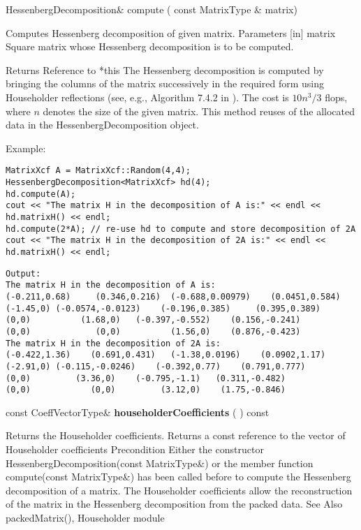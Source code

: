 HessenbergDecomposition\& compute  ( const MatrixType \&  matrix)   

Computes Hessenberg decomposition of given matrix. 
Parameters
[in] matrix Square matrix whose Hessenberg decomposition is to be computed.  

Returns Reference to *this 
The Hessenberg decomposition is computed by bringing the columns of the matrix successively in the required form using Householder reflections (see, e.g., Algorithm 7.4.2 in  \cite{Golub1996}). The cost is $10n^3/3$ flops, where $n$ denotes the size of the given matrix.
This method reuses of the allocated data in the HessenbergDecomposition object.


Example:
\begin{lstlisting}
MatrixXcf A = MatrixXcf::Random(4,4);
HessenbergDecomposition<MatrixXcf> hd(4);
hd.compute(A);
cout << "The matrix H in the decomposition of A is:" << endl << hd.matrixH() << endl;
hd.compute(2*A); // re-use hd to compute and store decomposition of 2A
cout << "The matrix H in the decomposition of 2A is:" << endl << hd.matrixH() << endl;
\end{lstlisting}

\begin{verbatim}
Output:
The matrix H in the decomposition of A is:
(-0.211,0.68)     (0.346,0.216)  (-0.688,0.00979)    (0.0451,0.584)
(-1.45,0) (-0.0574,-0.0123)    (-0.196,0.385)     (0.395,0.389)
(0,0)          (1.68,0)   (-0.397,-0.552)    (0.156,-0.241)
(0,0)             (0,0)          (1.56,0)    (0.876,-0.423)
The matrix H in the decomposition of 2A is:
(-0.422,1.36)    (0.691,0.431)   (-1.38,0.0196)    (0.0902,1.17)
(-2.91,0) (-0.115,-0.0246)    (-0.392,0.77)    (0.791,0.777)
(0,0)         (3.36,0)    (-0.795,-1.1)   (0.311,-0.482)
(0,0)            (0,0)         (3.12,0)    (1.75,-0.846)
\end{verbatim}


\vspace{0.3cm}					
const CoeffVectorType\& \textbf{householderCoefficients}  ( )  const 

Returns the Householder coefficients. 
Returns
a const reference to the vector of Householder coefficients
Precondition
Either the constructor HessenbergDecomposition(const MatrixType\&) or the member function compute(const MatrixType\&) has been called before to compute the Hessenberg decomposition of a matrix.
The Householder coefficients allow the reconstruction of the matrix  in the Hessenberg decomposition from the packed data.
See Also
packedMatrix(), Householder module 


